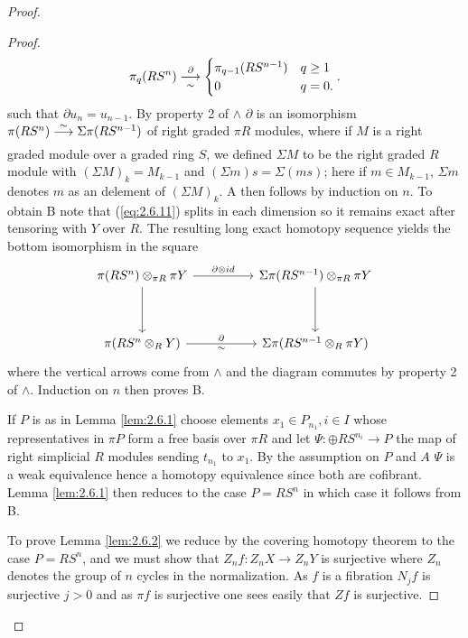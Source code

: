 \documentclass[../main]{subfiles}
\begin{document}
\begin{proof}
\begin{proof}
\[ 
    \pi_q (RS^{n}) \varrightarrow[\sim]{\partial} 
\begin{cases}
\pi_{q-1} (RS^{n-1}) & q \geq 1 \\
0 & q = 0 
.\end{cases}
.\]
such that $\partial u_n = u_{n-1}$. By property 2 of $\wedge $ $\partial$ is an isomorphism \\$\pi (RS^{n}) \varrightarrow{\sim} \Sigma \pi (RS^{n-1})$ of right graded $\pi R$ modules, where if $M$ is a right graded module over a graded ring $S$, we defined $\Sigma M$ to be the right graded $R$ module with $(\Sigma M)_k = M_{k-1}$ and $(\Sigma m) s = \Sigma (ms)$; here if $m \in M_{k-1}$, $\Sigma m$ denotes $m$ as an delement of $(\Sigma M)_{k}$. A then follows by induction on $n$. To obtain B note that (\ref{eq:2.6.11}) splits in each dimension so it remains exact after tensoring with $Y$ over $R$. The resulting long exact homotopy sequence yields the bottom isomorphism in the square
\[\begin{tikzcd}
	{\pi (RS^n) \otimes_{\pi R} \pi Y} && {\Sigma \pi (RS^{n-1}) \otimes_{\pi R} \pi Y} \\\\
	{\pi (RS^n \otimes_{R} Y)} && {\Sigma \pi (RS^{n-1} \otimes_{R} \pi Y)}
	\arrow[from=1-1, to=3-1]
	\arrow[from=1-3, to=3-3]
	\arrow["\partial", from=3-1, to=3-3]
	\arrow["\sim", draw=none, from=3-3, to=3-1]
	\arrow["{\partial \otimes id}", from=1-1, to=1-3]
\end{tikzcd}\]
where the vertical arrows come from $\wedge $ and the diagram commutes by property 2 of $\wedge $. Induction on $n$ then proves B.

If $P$ is as in Lemma \ref{lem:2.6.1} choose elements $x_1 \in P_{n_1}, i \in I$ whose representatives in $\pi P$ form a free basis over $\pi R$ and let $\Psi \colon \oplus RS^{n_i} \longrightarrow  P$ the map of right simplicial $R$ modules sending $t_{n_1}$ to $x_1$. By the assumption on $P$ and $A$ $\Psi $ is a weak equivalence hence a homotopy equivalence since both are cofibrant. Lemma \ref{lem:2.6.1} then reduces to the case $P = RS^{n}$ in which case it follows from B.

To prove Lemma \ref{lem:2.6.2} we reduce by the covering homotopy theorem to the case $P = RS^{n}$, and we must show that $Z_n f \colon Z_n X \longrightarrow  Z_n Y$ is surjective where $Z_n$ denotes the group of $n$ cycles in the normalization. As $f$ is a fibration $N_j f$ is surjective $j > 0$ and as $\pi f$ is surjective one sees easily that $Zf$ is surjective. 
\end{proof}


\end{proof}
\end{document}
